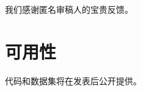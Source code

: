\documentclass[letterpaper,twocolumn,10pt]{article}
\begin{document}
我们感谢匿名审稿人的宝贵反馈。

\section*{可用性}

代码和数据集将在发表后公开提供。




\end{document}
